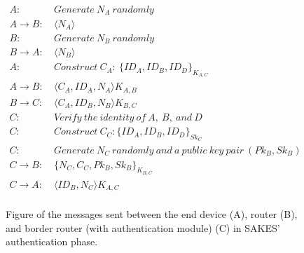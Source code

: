 \begin{figure}[h]
\begin{tcolorbox}[title=Authentication in SAKES]
\begin{align*}
A:\ & Generate\ N_A\ randomly\\
A \rightarrow B:\ & \langle{N_A}\rangle{}\\
B:\ & Generate\ N_B\ randomly\\
B \rightarrow A:\ & \langle{N_B}\rangle{}\\
A:\ & Construct\ C_{A}:\ \{ID_A, ID_B, ID_D\}_{K_{A,C}}\\
A \rightarrow B:\ & \langle{C_A, ID_A, N_A}\rangle{K_{A,B}}\\
B \rightarrow C:\ & \langle{C_A, ID_B, N_B}\rangle{K_{B,C}}\\
C:\ & Verify\ the\ identity\ of\ A,\ B,\ and\ D\\
C: \ & Construct\ C_C: \{ID_A, ID_B, ID_D\}_{Sk_{C}}\\
C:\ & Generate\ N_C\ randomly\ and\ a\ public\ key\ pair\ (Pk_B, Sk_B)\\
C \rightarrow B:\ & \{N_C, C_C, Pk_B, Sk_B\}_{K_{B,C}}\\
C \rightarrow A:\ & \langle{ID_B, N_C}\rangle{K_{A,C}}\\
\end{align*}
\end{tcolorbox}
\caption[Figure of the messages sent between the end device, router, and border router (with authentication module) in SAKES' authentication phase.]{Figure of the messages sent between the end device (A), router (B), and border router (with authentication module) (C) in SAKES' authentication phase.}
\label{fig:sakes-auth}
\end{figure}

